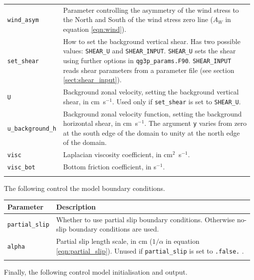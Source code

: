 \documentclass[a4paper]{book}
\begin{document}
\begin{longtable}{ | p{} | p{} | }
  \verb+wind_asym+  & Parameter controlling the asymmetry of the wind stress
                      to the North and South of the wind stress zero line ($A_W$
                      in equation \eqref{eqn:wind}). \\
  \verb+set_shear+  & How to set the background vertical shear. Has two possible
                      values: \verb+SHEAR_U+ and \verb+SHEAR_INPUT+.
                      \verb+SHEAR_U+ sets the shear using further options in
                      \verb+qg3p_params.F90+. \verb+SHEAR_INPUT+ reads shear
                      parameters from a parameter file (see section
                      \ref{sect:shear_input}). \\
  \verb+U+          & Background zonal velocity, setting the background vertical
                      shear, in cm~s${}^{-1}$. Used only if \verb+set_shear+ is
                      set to \verb+SHEAR_U+. \\
  \verb+u_background_h+ & Background zonal velocity function, setting the
                          background horizontal shear, in cm~s${}^{-1}$. The
                          argument \verb+y+ varies from zero at the south edge
                          of the domain to unity at the north edge of the
                          domain. \\
  \verb+visc+       & Laplacian viscosity coefficient, in
                      cm${}^2$~s${}^{-1}$. \\
  \verb+visc_bot+   & Bottom friction coefficient, in s${}^{-1}$. \\
  \hline
  \endfoot
\end{longtable}

The following control the model boundary conditions.

\begin{longtable}{ | p{} | p{} | }
  \hline
  Parameter & Description \\
  \hline
  \endhead
  \verb+partial_slip+ & Whether to use partial slip boundary conditions.
                        Otherwise no-slip boundary conditions are used. \\
  \verb+alpha+        & Partial slip length scale, in cm ($1 / \alpha$ in
                        equation \eqref{eqn:partial_slip}). Unused if
                        \verb+partial_slip+ is set to \verb+.false.+ . \\
  \hline
  \endfoot
\end{longtable}

Finally, the following control model initialisation and output.
\end{document}
